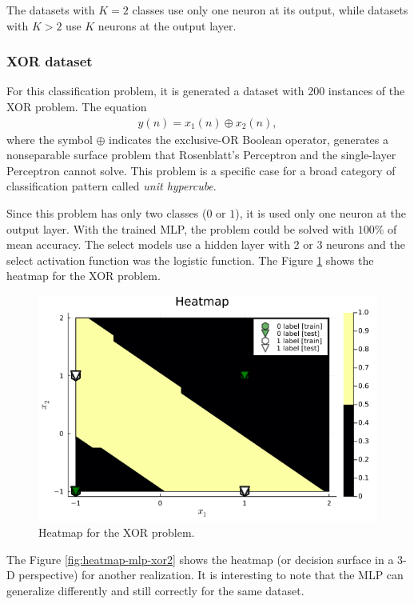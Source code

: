 \documentclass[12pt,a4paper]{article}
\begin{document}
The datasets with \(K=2\) classes use only one neuron at its output, while datasets with \(K>2\) use \(K\) neurons at the output layer.

\subsubsection{XOR dataset}

For this classification problem, it is generated a dataset with \(200\) instances of the XOR problem. The equation
\begin{align}
    y(n) = x_1 (n) \oplus x_2 (n),
\end{align}
where the symbol \(\oplus\) indicates the exclusive-OR Boolean operator, generates a nonseparable surface problem that Rosenblatt's Perceptron and the single-layer Perceptron cannot solve. This problem is a specific case for a broad category of classification pattern called \emph{unit hypercube}.

Since this problem has only two classes (\(0\) or \(1\)), it is used only one neuron at the output layer. With the trained MLP, the problem could be solved with \(100\%\) of mean accuracy. The select models use a hidden layer with 2 or 3 neurons and the select activation function was the logistic function. The Figure \ref{fig:heatmap-mlp-xor} shows the heatmap for the XOR problem.

\begin{figure}[H]
    \centering
    \includegraphics[scale=0.35]{../trab5 (MLP)/figs/XOR problem - heatmap - nr11.png}
    \caption{Heatmap for the XOR problem.}
    \label{fig:heatmap-mlp-xor}
\end{figure}

The Figure \ref{fig:heatmap-mlp-xor2} shows the heatmap (or decision surface in a 3-D perspective) for another realization. It is interesting to note that the MLP can generalize differently and still correctly for the same dataset.
\end{document}
